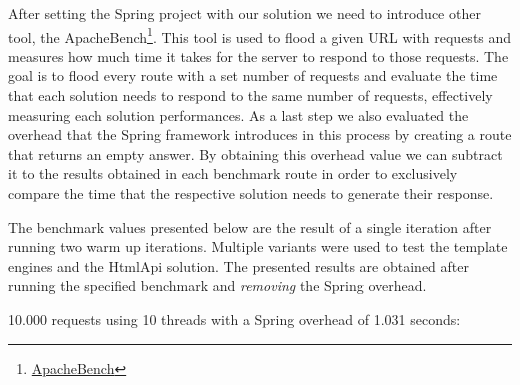 \noindent
After setting the Spring project with our solution we need to introduce other tool, the ApacheBench\footnote{\href{https://httpd.apache.org/docs/2.4/programs/ab.html}{ApacheBench}}. This tool is used to flood a given \ac{URL} with requests and measures how much time it takes for the server to respond to those requests. The goal is to flood every route with a set number of requests and evaluate the time that each solution needs to respond to the same number of requests, effectively measuring each solution performances. As a last step we also evaluated the overhead that the Spring framework introduces in this process by creating a route that returns an empty answer. By obtaining this overhead value we can subtract it to the results obtained in each benchmark route in order to exclusively compare the time that the respective solution needs to generate their response. 

\noindent
The benchmark values presented below are the result of a single iteration after running two warm up iterations. Multiple variants were used to test the template engines and the HtmlApi solution. The presented results are obtained after running the specified benchmark and \textit{removing} the Spring overhead.

\newpage

10.000 requests using 10 threads with a Spring overhead of 1.031 seconds:

